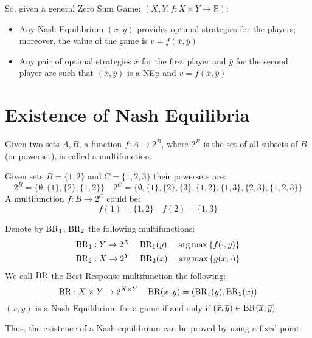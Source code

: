 \documentclass[../main.tex]{subfiles}
\begin{document}
So, given a general Zero Sum Game: $(X,Y, f: X \times Y \to \mathbb{R})$:
\begin{itemize}
    \item Any Nash Equilibrium $(\overline{x}, \overline{y})$ provides optimal strategies for the players; moreover, the value of the game is $v = f(\overline{x}, \overline{y})$
    \item Any pair of optimal strategies $\overline{x}$ for the first player and $\overline{y}$ for the second player are such that $(\overline{x}, \overline{y})$ is a \gls{NEp} and $v = f(\overline{x}, \overline{y})$
\end{itemize}

\section{Existence of Nash Equilibria}
\begin{definition}[Multifunction]
    Given two sets $A, B$, a function $f: A \to 2^B$, where $2^B$ is the set of all subsets of $B$ (or powerset), is called a multifunction.
\end{definition}
\begin{example} Given sets $B = \{1,2\}$ and $C=\{1,2,3\}$ their powersets are:
    \[
        2^B = \{\emptyset, \{1\}, \{2\}, \{1,2\}\} \quad 2^C = \{\emptyset, \{1\}, \{2\}, \{3\}, \{1,2\}, \{1,3\}, \{2,3\}, \{1,2,3\}\}
    \]
    A multifunction $f: B \to 2^C$ could be:
    \[
        f(1) = \{1,2\} \quad f(2) = \{1,3\}
    \]
\end{example}
\newpage %
\begin{definition}
    Denote by $\operatorname{BR}_1$, $\operatorname{BR}_2$ the following multifunctions:
    \begin{gather*}
        \operatorname{BR}_1: Y \to 2^X \quad \operatorname{BR}_1(y) = \operatorname*{arg\,max}{\{f(\cdot, y)\}}\\
        \operatorname{BR}_2: X \to 2^Y \quad \operatorname{BR}_2(x) = \operatorname*{arg\,max}{\{g(x, \cdot)\}}
    \end{gather*}
    We call $\operatorname{BR}$ the Best Response multifunction the following:
    \[
        \operatorname{BR}: X \times Y \to 2^{X \times Y} \quad \operatorname{BR}(x,y) = (\operatorname{BR}_1(y), \operatorname{BR}_2(x))
    \]
    $(\overline{x}, \overline{y})$ is a Nash Equilibrium for a game if and only if $(\overline{x}, \overline{y}) \in \operatorname{BR}(\overline{x}, \overline{y})$
\end{definition}

Thus, the existence of a Nash equilibrium can be proved by using a fixed point.
\end{document}

